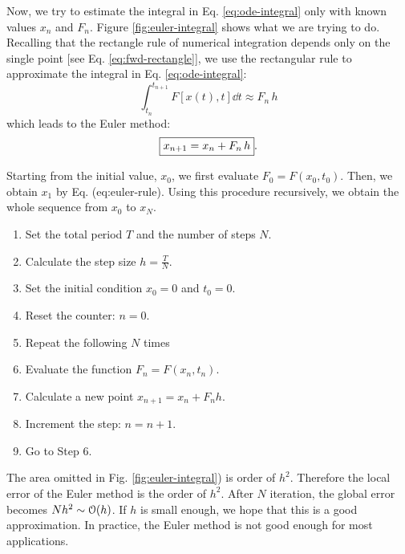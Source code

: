 Now, we try to estimate the integral in Eq.  \eqref{eq:ode-integral} only with known values $x_n$ and $F_n$.
Figure \ref{fig:euler-integral} shows what we are trying to do. Recalling that the rectangle rule of numerical integration depends only on the single point [see Eq. \eqref{eq:fwd-rectangle}], we use the rectangular rule to approximate the integral in Eq. \eqref{eq:ode-integral}:
\begin{equation}\label{eq:ode-rectangular}
\int_{t_n}^{t_{n+1}} F[x(t),t] \dd{t} \approx F_n\, h
\end{equation}
which leads to the Euler method:
\begin{equation}\label{eq:euler-rule}
\fbox{$x_{n+1} = x_n + F_n\, h$}.
\end{equation}


Starting from the initial value, $x_0$, we first evaluate $F_0=F(x_0,t_0)$.  Then, we obtain $x_1$ by Eq. ({eq:euler-rule}).
Using this procedure recursively, we obtain the whole sequence from $x_0$ to $x_N$.

\bigskip 
\begin{myalgobox}
	\label{algo:euler}
	
	\medskip
	\begin{minipage}{5.5in}
		\begin{enumerate}
			\item Set the total period $T$ and the number of steps $N$.
			\item Calculate the step size $h=\displaystyle\frac{T}{N}$.
			\item Set the initial condition $x_0=0$ and $t_0=0$.
			\item Reset the counter: $n=0$.
			\item Repeat the following $N$ times
			\item Evaluate the function $F_n=F(x_n,t_n)$.
			\item Calculate a new point $x_{n+1}=x_n+F_n h$.
			\item Increment the step: $n=n+1$.
			\item Go to Step 6.
		\end{enumerate}
	\end{minipage}
\end{myalgobox}
	
\bigskip
	
The area omitted in Fig. \ref{fig:euler-integral})
is order of $h^2$.  Therefore the local error of the Euler method is the order of $h^2$. After $N$ iteration, the global error becomes $N h^2 \sim \order{h}$.  If $h$ is small enough, we hope that this is a good approximation. In practice, the Euler method is not good enough for most applications.



